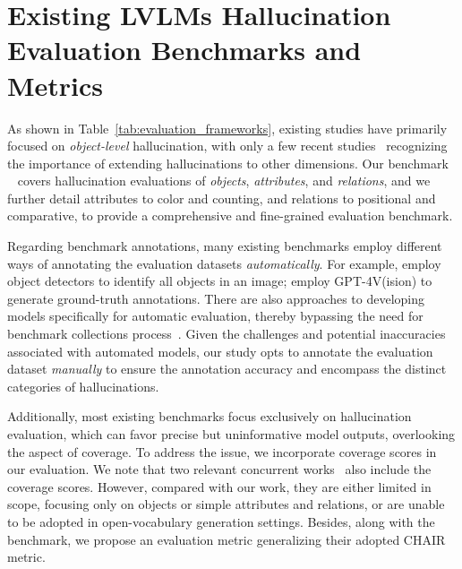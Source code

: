 \vspace{-4mm}
\section{Existing LVLMs Hallucination Evaluation Benchmarks and Metrics}
\vspace{-2mm}

As shown in Table~\ref{tab:evaluation_frameworks}, existing studies \cite{li-etal-2023-evaluating, Wang2023EvaluationAA,Zhai2023HallESwitchRA, Lovenia2023NegativeOP,Villa2023BehindTM,Petryk2024ALOHaAN,Kaul2024THRONEAO} have primarily focused on \textit{object-level} hallucination, with only a few recent studies~\cite{faithscore, wang2023llm,Jiang2024HalEvalAU,Zhang2024QuantityMT} recognizing the importance of extending hallucinations to other dimensions. Our benchmark \data~ covers hallucination evaluations of \textit{objects}, \textit{attributes}, and \textit{relations}, and we further detail attributes to color and counting, and relations to positional and comparative, to provide a comprehensive and fine-grained evaluation benchmark. 

Regarding benchmark annotations, many existing benchmarks employ different ways of annotating the evaluation datasets \textit{automatically}. For example, \citet{li-etal-2023-evaluating} employ object detectors to identify all objects in an image; \citet{Zhai2023HallESwitchRA} employ GPT-4V(ision) to generate ground-truth annotations. There are also approaches to developing models specifically for automatic evaluation, thereby bypassing the need for benchmark collections process~\cite{Wang2023EvaluationAA, Gunjal2023DetectingAP}. Given the challenges and potential inaccuracies associated with automated models, our study opts to annotate the evaluation dataset \textit{manually} to ensure the annotation accuracy and encompass the distinct categories of hallucinations. 

Additionally, most existing benchmarks focus exclusively on hallucination evaluation, which can favor precise but uninformative model outputs, overlooking the aspect of coverage. To address the issue, we incorporate coverage scores in our evaluation. We note that two relevant concurrent works~\cite{wang2023llm,Zhai2023HallESwitchRA} also include the coverage scores. However, compared with our work, they are either limited in scope, focusing only on objects or simple attributes and relations, or are unable to be adopted in open-vocabulary generation settings. Besides, along with the benchmark, we propose an evaluation metric generalizing their adopted CHAIR metric.